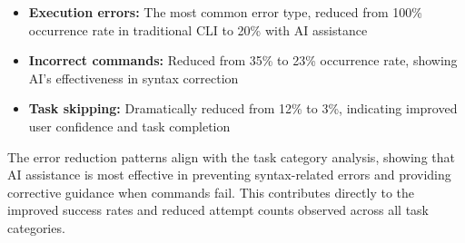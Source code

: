 \begin{itemize}
	\item \textbf{Execution errors:} The most common error type, reduced from 100\% occurrence rate in traditional CLI to 20\% with AI assistance
	\item \textbf{Incorrect commands:} Reduced from 35\% to 23\% occurrence rate, showing AI's effectiveness in syntax correction
	\item \textbf{Task skipping:} Dramatically reduced from 12\% to 3\%, indicating improved user confidence and task completion
\end{itemize}

The error reduction patterns align with the task category analysis, showing that AI assistance is most effective in preventing syntax-related errors and providing corrective guidance when commands fail. This contributes directly to the improved success rates and reduced attempt counts observed across all task categories.

